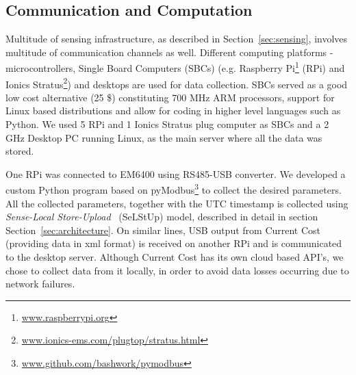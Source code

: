 \documentclass[10pt]{sensys-proc}
\newcommand{\secref}[1]{Section~\ref{#1}}
\newcommand{\tabref}[1]{Table~\ref{#1}}
\newcommand{\selstup}{SeLStUp}
\newcommand{\paradigms}{Sense-Local Store-Upload~}
\begin{document}
\subsection{Communication and Computation}
Multitude of sensing infrastructure, as described in \secref{sec:sensing}, involves multitude of communication channels as well. Different computing platforms - microcontrollers, Single Board Computers (SBCs) (e.g. Raspberry Pi\footnote{\url{www.raspberrypi.org}} (RPi) and Ionics Stratus\footnote{\url{www.ionics-ems.com/plugtop/stratus.html}}) and desktops are used for data collection.  
SBCs served as a good low cost alternative (25 \$) constituting 700 MHz ARM processors, support for Linux based distributions and allow for coding in higher level languages such as Python. %
We used 5 RPi and 1 Ionics Stratus plug computer as SBCs and a 2 GHz Desktop PC running Linux, as the main server where all the data was stored. %

One RPi was connected to EM6400 using RS485-USB converter. We developed a custom Python program based on pyModbus\footnote{\url{www.github.com/bashwork/pymodbus}} to collect the desired parameters. %
All the collected parameters, together with the UTC timestamp is %
collected using \emph{\paradigms} (\selstup) model, described in detail in section \secref{sec:architecture}. On similar lines, USB output from Current Cost (providing data in xml format) is received on another RPi and is communicated to the desktop server. %
Although Current Cost has its own cloud based API's, we chose to collect data from it locally, in order to avoid data losses occurring due to network failures. 
\end{document}
